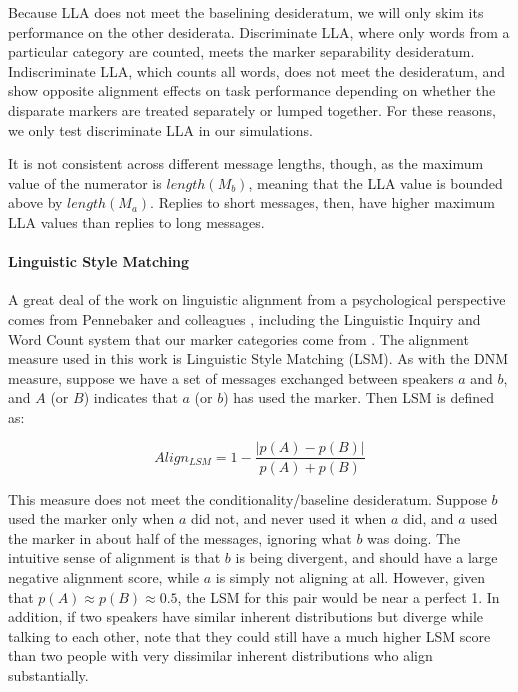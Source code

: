 \documentclass{acm_proc_article-sp}
\begin{document}
Because LLA does not meet the baselining desideratum, we will only skim its performance on the other desiderata. Discriminate LLA, where only words from a particular category are counted, meets the marker separability desideratum.  Indiscriminate LLA, which counts all words, does not meet the desideratum, and \cite{FusaroliEtAl2012} show opposite alignment effects on task performance depending on whether the disparate markers are treated separately or lumped together.  For these reasons, we only test discriminate LLA in our simulations.

It is not consistent across different message lengths, though, as the maximum value of the numerator is $length(M_b)$, meaning that the LLA value is bounded above by $length(M_a)$. Replies to short messages, then, have higher maximum LLA values than replies to long messages.

\paragraph{Linguistic Style Matching} A great deal of the work on linguistic alignment from a psychological perspective comes from Pennebaker and colleagues \cite{NiederhofferPennebaker2002,GonzalesHancockPennebaker2009,IrelandEtAl2011}, including the Linguistic Inquiry and Word Count system that our marker categories come from \cite{LIWC}.  The alignment measure used in this work is Linguistic Style Matching (LSM). As with the DNM measure, suppose we have a set of messages exchanged between speakers $a$ and $b$, and $A$ (or $B$) indicates that $a$ (or $b$) has used the marker. Then LSM is defined as:

\begin{equation}
Align_{LSM} = 1 - \frac{|p(A)-p(B)|}{p(A)+p(B)}
\end{equation}

This measure does not meet the conditionality/baseline desideratum. Suppose $b$ used the marker only when $a$ did not, and never used it when $a$ did, and $a$ used the marker in about half of the messages, ignoring what $b$ was doing.  The intuitive sense of alignment is that $b$ is being divergent, and should have a large negative alignment score, while $a$ is simply not aligning at all. However, given that $p(A) \approx p(B) \approx 0.5$, the LSM for this pair would be near a perfect 1.  In addition, if two speakers have similar inherent distributions but diverge while talking to each other, note that they could still have a much higher LSM score than two people with very dissimilar inherent distributions who align substantially.
\end{document}
